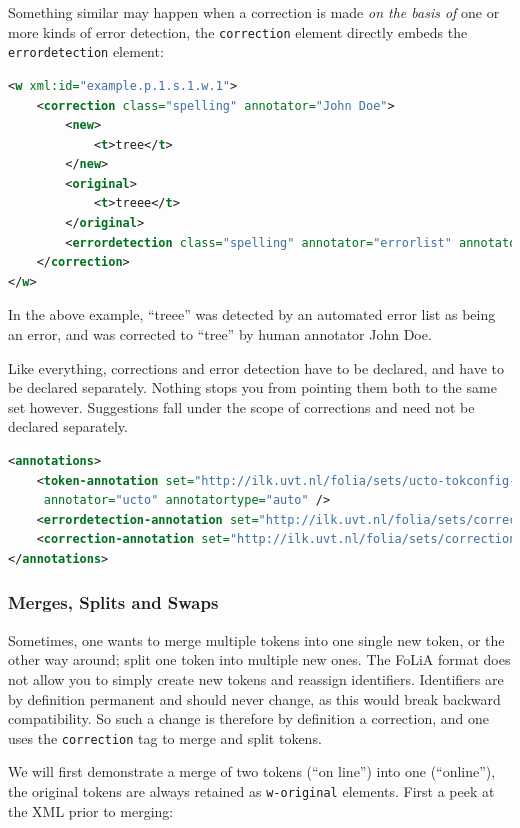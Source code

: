 \documentclass[a4paper,12pt]{report}
\begin{document}
Something similar may happen when a correction is made \emph{on the basis of} one or more kinds of error detection, the \texttt{correction} element directly embeds the \texttt{errordetection} element:

\begin{lstlisting}[language=xml]
<w xml:id="example.p.1.s.1.w.1">
    <correction class="spelling" annotator="John Doe">
        <new>
            <t>tree</t>
        </new>
        <original>
            <t>treee</t>
        </original>
        <errordetection class="spelling" annotator="errorlist" annotatortype="auto" error="yes" />
    </correction>
</w>
\end{lstlisting}

In the above example, ``treee'' was detected by an automated error list as being an error, and was corrected to ``tree'' by human annotator John Doe.

Like everything, corrections and error detection have to be declared, and have to be declared separately. Nothing stops you from pointing them both to the same set however. Suggestions fall under the scope of corrections and need not be declared separately.

\begin{lstlisting}[language=xml]
<annotations>
    <token-annotation set="http://ilk.uvt.nl/folia/sets/ucto-tokconfig-nl" 
     annotator="ucto" annotatortype="auto" />
    <errordetection-annotation set="http://ilk.uvt.nl/folia/sets/corrections" />
    <correction-annotation set="http://ilk.uvt.nl/folia/sets/corrections" />
</annotations>
\end{lstlisting}

\subsubsection{Merges, Splits and Swaps} 

Sometimes, one wants to merge multiple tokens into one single new token, or the other way around; split one token into multiple new ones. The FoLiA format does not allow you to simply create new tokens and reassign identifiers. Identifiers are by definition permanent and should never change, as this would break backward compatibility. So such a change is therefore by definition a correction, and one uses the \texttt{correction} tag to merge and split tokens.

We will first demonstrate a merge of two tokens (``on line'') into one (``online''), the original tokens are always retained as \texttt{w-original} elements. First a peek at the XML prior to merging:
\end{document}
